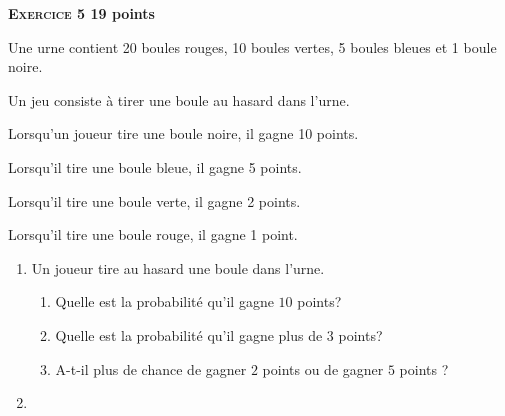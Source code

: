 \textbf{{\large \textsc{Exercice 5}} \hfill 19 points}

\medskip

Une urne contient 20 boules rouges, 10 boules vertes, 5 boules bleues et 1 boule noire.

Un jeu consiste à tirer une boule au hasard dans l'urne.

Lorsqu'un joueur tire une boule noire, il gagne 10 points.

Lorsqu'il tire une boule bleue, il gagne 5 points.

Lorsqu'il tire une boule verte, il gagne 2 points.

Lorsqu'il tire une boule rouge, il gagne 1 point.

\medskip

\begin{enumerate}
\item Un joueur tire au hasard une boule dans l'urne.
	\begin{enumerate}
		\item Quelle est la probabilité qu'il gagne $10$ points?
		\item Quelle est la probabilité qu'il gagne plus de $3$ points?
		\item A-t-il plus de chance de gagner $2$ points ou de gagner $5$ points ?
	\end{enumerate}	

\item~


\end{enumerate}

